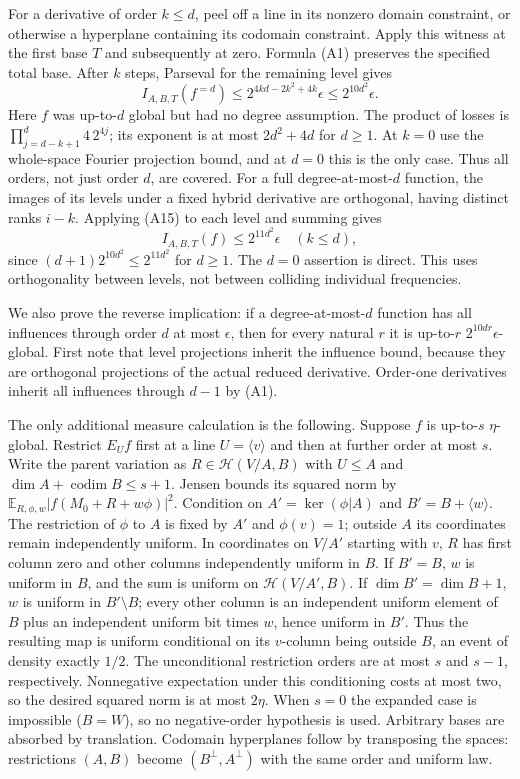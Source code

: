 For a derivative of order $k\le d$, peel off a line in its nonzero
domain constraint, or otherwise a hyperplane containing its codomain
constraint. Apply this witness at the first base $T$ and subsequently
at zero. Formula (A1) preserves the specified total base. After $k$
steps, Parseval for the remaining level gives
\[
 I_{A,B,T}(f^{=d})
 \le2^{4kd-2k^2+4k}\epsilon
 \le2^{10d^2}\epsilon.                            \tag{A15}
\]
Here $f$ was up-to-$d$ global but had no degree assumption.
The product of losses is
$\prod_{j=d-k+1}^d4\,2^{4j}$; its exponent is at most $2d^2+4d$
for $d\ge1$. At $k=0$ use the whole-space Fourier projection bound,
and at $d=0$ this is the only case. Thus all orders, not just order $d$,
are covered. For a full degree-at-most-$d$ function, the images of its
levels under a fixed hybrid derivative are orthogonal, having distinct
ranks $i-k$. Applying (A15) to each level and summing gives
\[
 I_{A,B,T}(f)\le2^{11d^2}\epsilon\quad(k\le d),       \tag{A16}
\]
since $(d+1)2^{10d^2}\le2^{11d^2}$ for $d\ge1$.
The $d=0$ assertion is direct. This uses orthogonality between levels,
not between colliding individual frequencies.

We also prove the reverse implication: if a degree-at-most-$d$ function
has all influences through order $d$ at most $\epsilon$, then for every
natural $r$ it is up-to-$r$ $2^{10dr}\epsilon$-global. First note that
level projections inherit the influence bound, because they are
orthogonal projections of the actual reduced derivative. Order-one
derivatives inherit all influences through $d-1$ by (A1).

The only additional measure calculation is the following. Suppose $f$
is up-to-$s$ $\eta$-global. Restrict $E_Uf$ first at a line $U=\langle v\rangle$
and then at further order at most $s$. Write the parent variation as
$R\in\mathcal H(V/A,B)$ with $U\le A$ and
$\dim A+\operatorname{codim}B\le s+1$.
Jensen bounds its squared norm by
$\mathbb E_{R,\phi,w}|f(M_0+R+w\phi)|^2$.
Condition on $A'=\ker(\phi|A)$ and $B'=B+\langle w\rangle$.
The restriction of $\phi$ to $A$ is fixed by $A'$ and $\phi(v)=1$;
outside $A$ its coordinates remain independently uniform.
In coordinates on $V/A'$ starting with $v$, $R$ has first column zero
and other columns independently uniform in $B$.
If $B'=B$, $w$ is uniform in $B$, and the sum is uniform on
$\mathcal H(V/A',B)$. If $\dim B'=\dim B+1$, $w$ is uniform in
$B'\setminus B$; every other column is an independent uniform element
of $B$ plus an independent uniform bit times $w$, hence uniform in $B'$.
Thus the resulting map is uniform conditional on its $v$-column being
outside $B$, an event of density exactly $1/2$.
The unconditional restriction orders are at most $s$ and $s-1$,
respectively. Nonnegative expectation under this conditioning costs
at most two, so the desired squared norm is at most $2\eta$.
When $s=0$ the expanded case is impossible ($B=W$), so no negative-order
hypothesis is used. Arbitrary bases are absorbed by translation.
Codomain hyperplanes follow by transposing the spaces: restrictions
$(A,B)$ become $(B^\perp,A^\perp)$ with the same order and uniform law.

